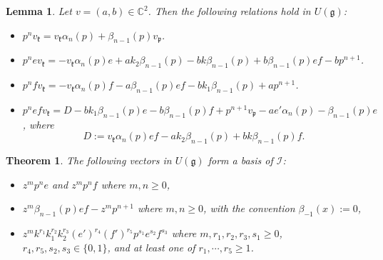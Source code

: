 \documentclass[10pt,a4paper]{amsart}
\newtheorem{lem}{Lemma}
\newtheorem{theorem}{Theorem}
\newcommand{\C}{\mathbb C}
\newcommand{\cI}{\mathcal I}
\newcommand{\g}{\mathfrak}
\begin{document}
\begin{lem}\label{Second part}
Let $v=(a,b)\in\C^2$. Then the following relations hold in $U(\g g)$:
\begin{itemize}
\item[\rm (i)]
$p^nv_{\mathfrak k}=v_{\mathfrak k}\alpha_{n}(p)+\beta_{n-1}(p)v_{\mathfrak p}$.
\item[\rm (ii)]
$p^nev_{\mathfrak k}=-v_{\mathfrak k}\alpha_{n}(p)e+ak_2\beta_{n-1}(p)-bk\beta_{n-1}(p)+b\beta_{n-1}(p)ef-bp^{n+1}$.

\item[\rm (iii)]
$ p^nfv_{\mathfrak k}=-v_{\mathfrak k}\alpha_{n}(p)f-a\beta_{n-1}(p)ef-bk_1\beta_{n-1}(p)+ap^{n+1}$.
\item[\rm (iv)]
$
p^nefv_{\mathfrak k}=D-bk_1\beta_{n-1}(p)e-b\beta_{n-1}(p)f+p^{n+1}v_{\mathfrak p}-ae'\alpha_{n}(p)-\beta_{n-1}(p)e$, 
where \[
D:=v_{\mathfrak k}\alpha_{n}(p)ef-ak_2\beta_{n-1}(p)+bk\beta_{n-1}(p)f.
\]
\end{itemize}
\end{lem}

\begin{theorem}\label{basis of I}
The following vectors in $U(\g g)$ form  a basis of $\cI$:

\begin{itemize}
\item[\rm (i)] $z^mp^ne$ and $z^mp^nf$ where $m,n\geqslant 0$,
\item[\rm (ii)] $z^m\beta_{n-1}(p)ef-z^mp^{n+1}$ where $m,n\geqslant 0$, with the convention $\beta_{-1}(x):=0$,\item[\rm (iii)] $z^mk^{r_1}k_1^{r_2}k_2^{r_3}(e')^{r_4}(f')^{r_5}p^{s_1}e^{s_2}f^{s_3}$ where $m,r_1,r_2,r_3,s_1\geq 0$, $r_4,r_5,s_2,s_3\in\{0,1\}$, and 
 at least one of $r_1,\cdots , r_5\geq 1$.
\end{itemize}\end{theorem}
\end{document}
